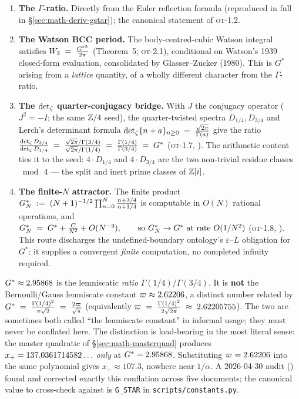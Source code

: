 \begin{enumerate}[leftmargin=1.4em, itemsep=2pt]
  \item \textbf{The $\Gamma$-ratio.} Directly from the Euler reflection formula
    (reproduced in full in \S\ref{sec:math-deriv-gstar}); the canonical
    statement of \textsc{ot}-1.2.
  \item \textbf{The Watson BCC period.} The body-centred-cubic Watson integral
    satisfies $W_3 \;=\; \frac{G^{*2}}{2\pi}$ (Theorem~5; \textsc{ot}-2.1), conditional on
    Watson's 1939 closed-form evaluation, consolidated by Glasser--Zucker
    (1980). This is $G^{*}$ arising from a \emph{lattice} quantity, of a wholly
    different character from the $\Gamma$-ratio.
  \item \textbf{The $\operatorname{det}\nolimits_{\zeta}$ quarter-conjugacy bridge.} With $J$ the conjugacy
    operator ($J^{2}=-I$; the same $\mathbb{Z}/4$ seed), the quarter-twisted spectra
    $D_{1/4},D_{3/4}$ and Lerch's determinant formula $\operatorname{det}\nolimits_{\zeta}\{n + a\}_{n\ge 0} \;=\; \frac{\sqrt{2\pi}}{\Gamma(a)}$ give the ratio
    $\frac{\operatorname{det}\nolimits_{\zeta} D_{3/4}}{\operatorname{det}\nolimits_{\zeta} D_{1/4}} \;=\; \frac{\sqrt{2\pi}/\Gamma(3/4)}{\sqrt{2\pi}/\Gamma(1/4)} \;=\; \frac{\Gamma(1/4)}{\Gamma(3/4)} \;=\; G^{*}$ (\textsc{ot}-1.7, ). The arithmetic content ties
    it to the seed: $4\cdot D_{1/4}$ and $4\cdot D_{3/4}$ are the two
    non-trivial residue classes $\bmod\,4$ --- the split and inert prime classes
    of $\mathbb{Z}[i]$.
  \item \textbf{The finite-$N$ attractor.} The finite product
    $G^{*}_{N} \;:=\; (N+1)^{-1/2}\prod_{n=0}^{N}\frac{n + 3/4}{n + 1/4}$ is computable in $O(N)$ rational operations, and
    $G^{*}_{N} \;=\; G^{*} + \frac{C}{N^{2}} + O(N^{-3}), \qquad\text{so } G^{*}_{N} \to G^{*} \text{ at rate } O(1/N^{2})$ (\textsc{ot}-1.8, ). This route discharges the
    undefined-boundary ontology's $\varepsilon$--$L$ obligation for $G^{*}$:
    it supplies a convergent \emph{finite} computation, no completed infinity
    required.
\end{enumerate}

\begin{boundarybox}
$G^{*}\approx2.95868$ is the lemniscatic \emph{ratio}
$\Gamma(1/4)/\Gamma(3/4)$. It is \textbf{not} the Bernoulli/Gauss lemniscate
constant $\varpi\approx2.62206$, a distinct number related by
$G^{*} \;=\; \frac{\Gamma(1/4)^2}{\pi\sqrt 2} \;=\; \frac{2\varpi}{\sqrt\pi}$ (equivalently $\varpi \;=\; \frac{\Gamma(1/4)^2}{2\sqrt{2\pi}} \;\approx\; 2.62205755$). The two are sometimes both called
``the lemniscate constant'' in informal usage; they must never be conflated
here. The distinction is load-bearing in the most literal sense: the master
quadratic of \S\ref{sec:math-masterquad} produces $x_+=137.0361714582\ldots$ \emph{only}
at $G^{*}=2.95868$. Substituting $\varpi=2.62206$ into the same
polynomial gives $x_+\approx 107.3$, nowhere near $1/\alpha$. A 2026-04-30
audit () found and corrected exactly this conflation across five
documents; the canonical value to cross-check against is \texttt{G\_STAR} in
\texttt{scripts/constants.py}.
\end{boundarybox}

